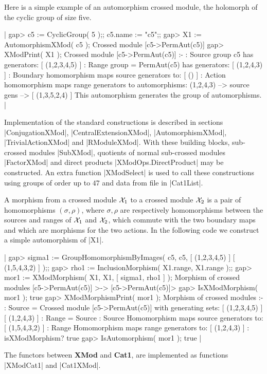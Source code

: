 Here is a simple example of an automorphism crossed module, 
the holomorph of the cyclic group of size five.

|    gap> c5 := CyclicGroup( 5 );;   c5.name := "c5";;
    gap> X1 := AutomorphismXMod( c5 );
    Crossed module [c5->PermAut(c5)]
    gap> XModPrint( X1 );
    Crossed module [c5->PermAut(c5)] :- 
    : Source group c5 has generators:
      [ (1,2,3,4,5) ]
    : Range group = PermAut(c5) has generators:
      [ (1,2,4,3) ]
    : Boundary homomorphism maps source generators to:
      [ () ]
    : Action homomorphism maps range generators to automorphisms:
      (1,2,4,3) --> { source gens --> [ (1,3,5,2,4) ] }
      This automorphism generates the group of automorphisms.    |


Implementation of the standard constructions is described in sections
|ConjugationXMod|, |CentralExtensionXMod|, 
|AutomorphismXMod|, |TrivialActionXMod| and |RModuleXMod|.
With these building blocks, sub-crossed modules |SubXMod|,
quotients of normal sub-crossed modules |FactorXMod|
and direct products |XModOps.DirectProduct| may be constructed.
An extra function  |XModSelect|  is used to call these constructions
using groups of order up to $47$ and data from file in |Cat1List|.

A morphism from a crossed module ${\cal X}_1$ to a crossed module 
${\cal X}_2$  is a pair of homomorphisms  $(\sigma, \rho)$,  
where  $\sigma, \rho$
are respectively homomorphisms between the sources and ranges
of  ${\cal X}_1$  and  ${\cal X}_2$,  
which commute with the two boundary maps
and which are morphisms for the two actions.
In the following code we construct a simple automorphism of |X1|.

|    gap> sigma1 := GroupHomomorphismByImages( c5, c5, [ (1,2,3,4,5) ]
            [ (1,5,4,3,2) ] );;
    gap> rho1 := InclusionMorphism( X1.range, X1.range );;
    gap> mor1 := XModMorphism( X1, X1, [ sigma1, rho1 ] );
    Morphism of crossed modules [c5->PermAut(c5)] >-> [c5->PermAut(c5)]>
    gap> IsXModMorphism( mor1 );
    true
    gap> XModMorphismPrint( mor1 );
    Morphism of crossed modules :- 
    : Source = Crossed module [c5->PermAut(c5)] with generating sets:
      [ (1,2,3,4,5) ]
      [ (1,2,4,3) ]
    : Range = Source
    : Source Homomorphism maps source generators to:
      [ (1,5,4,3,2) ]
    : Range Homomorphism maps range generators to:
      [ (1,2,4,3) ]
    : isXModMorphism? true
    gap> IsAutomorphism( mor1 );
    true  |

The functors between \textbf{XMod} and \textbf{Cat1}, 
are implemented as functions  |XModCat1| and |Cat1XMod|.

